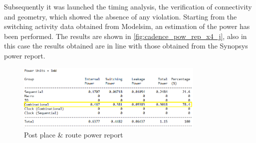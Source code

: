Subsequently it was launched the timing analysis, the verification of connectivity and geometry, which showed the absence of any violation. Starting from the switching activity data obtained from Modelsim, an estimation of the power has been performed. The results are shown in \autoref{fig:cadence_pow_rep_x4_j}, also in this case the results obtained are in line with those obtained from the Synopsys power report.

\begin{figure}[h]
	\center
	\includegraphics[width=0.8\textwidth]{images/rep_power_x4_cadence_j_mod.png}
	\caption{Post place \& route power report}
	\label{fig:cadence_pow_rep_x4_j}
\end{figure}
